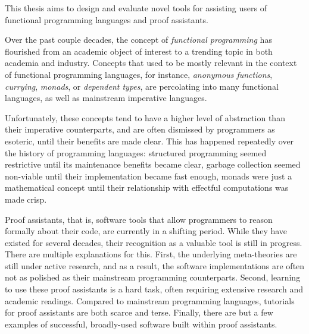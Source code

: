 This thesis aims to design and evaluate novel tools for assisting users of
functional programming languages and proof assistants.

Over the past couple decades, the concept of \emph{functional programming} has
flourished from an academic object of interest to a trending topic in both
academia and industry.  Concepts that used to be mostly relevant in the context
of functional programming languages, for instance, \emph{anonymous functions},
\emph{currying}, \emph{monads}, or \emph{dependent types}, are percolating into
many functional languages, as well as mainstream imperative languages.

Unfortunately, these concepts tend to have a higher level of abstraction than
their imperative counterparts, and are often dismissed by programmers as
esoteric, until their benefits are made clear.  This has happened repeatedly
over the history of programming languages: structured programming seemed
restrictive until its maintenance benefits became clear, garbage collection
seemed non-viable until their implementation became fast enough, monads
were just a mathematical concept until their relationship with effectful
computations was made crisp.

Proof assistants, that is, software tools that allow programmers to reason
formally about their code, are currently in a shifting period.  While they have
existed for several decades, their recognition as a valuable tool is still in
progress.  There are multiple explanations for this.  First, the underlying
meta-theories are still under active research, and as a result, the software
implementations are often not as polished as their mainstream programming
counterparts.  Second, learning to use these proof assistants is a hard task,
often requiring extensive research and academic readings.  Compared to
mainstream programming languages, tutorials for proof assistants are both
scarce and terse.  Finally, there are but a few examples of successful,
broadly-used software built within proof assistants.

